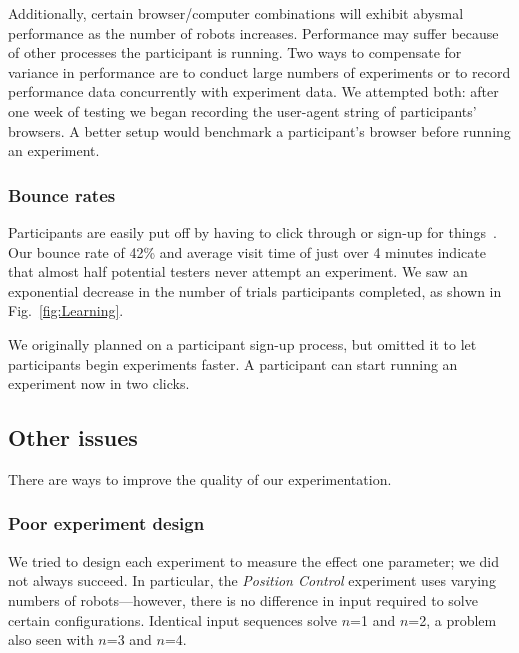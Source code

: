 Additionally, certain browser/computer combinations will exhibit abysmal performance as the number of robots increases. Performance may suffer because of other processes the participant is running. Two ways to compensate for variance in performance are to conduct large numbers of experiments or to record performance data concurrently with experiment data. We attempted both: after one week of testing we began recording the user-agent string of participants' browsers. A better setup would benchmark a participant's browser before running an experiment.


\subsubsection{Bounce rates}
Participants are easily put off by having to click through or sign-up for things~\cite{krug2009don}.  Our bounce rate of 42\% and average visit time of just over 4 minutes indicate that almost half potential testers never attempt an experiment. We saw an exponential decrease in the number of trials participants completed, as shown in Fig.~\ref{fig:Learning}.

We originally planned on a participant sign-up process, but omitted it to let participants begin experiments faster. A participant can start running an experiment now in two clicks.


\subsection{Other issues}

There are ways to improve the quality of our experimentation.

\subsubsection{Poor experiment design}

We tried to design each experiment to measure the effect one parameter; we did not always succeed. In particular, the \emph{Position Control} experiment uses varying numbers of robots---however, there is no difference in input required to solve certain configurations. Identical input sequences solve $n$=1 and $n$=2, a problem also seen with $n$=3 and $n$=4.

